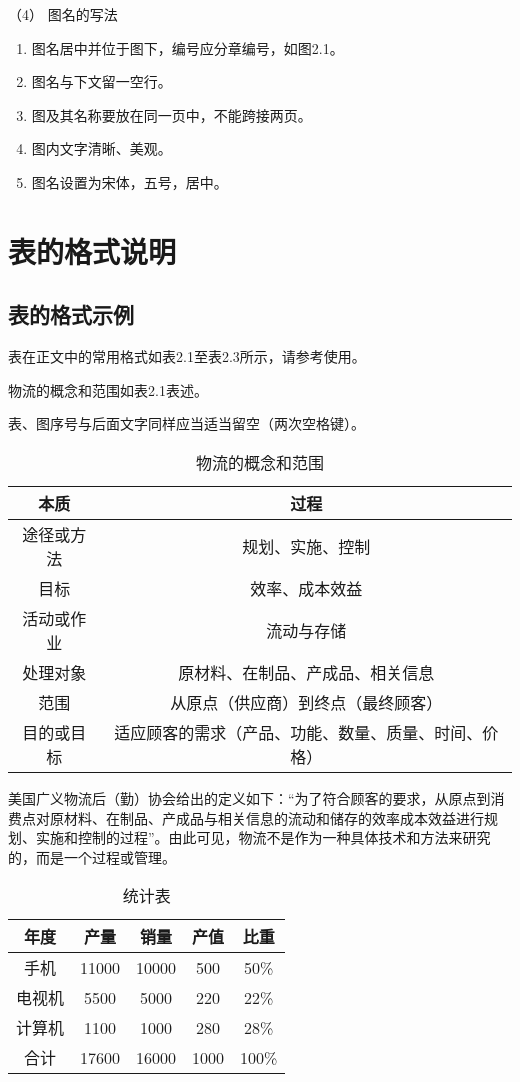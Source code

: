 （4） 图名的写法
\begin{enumerate}[label=\circled{\arabic*}]
\item 图名居中并位于图下，编号应分章编号，如图2.1。
\item 图名与下文留一空行。
\item 图及其名称要放在同一页中，不能跨接两页。
\item 图内文字清晰、美观。
\item 图名设置为宋体，五号，居中。
\end{enumerate}

\section{表的格式说明}
\subsection{表的格式示例}
表在正文中的常用格式如表2.1至表2.3所示，请参考使用。

物流的概念和范围如表2.1表述。

表、图序号与后面文字同样应当适当留空（两次空格键）。

\begin{table}
	\centering
	\song\wuhao 
	\caption{物流的概念和范围}
	\begin{tabular}{cc}
	\hline
	本质&过程\\
	\hline
	途径或方法&规划、实施、控制\\
	目标&效率、成本效益\\
	活动或作业&流动与存储\\
	处理对象&原材料、在制品、产成品、相关信息\\
	范围&从原点（供应商）到终点（最终顾客）\\
	目的或目标&适应顾客的需求（产品、功能、数量、质量、时间、价格）\\
	\hline
	\end{tabular}
\end{table}

美国广义物流后（勤）协会给出的定义如下：“为了符合顾客的要求，从原点到消费点对原材料、在制品、产成品与相关信息的流动和储存的效率成本效益进行规划、实施和控制的过程”。由此可见，物流不是作为一种具体技术和方法来研究的，而是一个过程或管理。

\begin{table}
	\centering
	\song\wuhao
	\caption{ 统计表}
	\begin{tabular}{ccccc}
	\hline
	年度&产量&销量&产值&比重\\
	\hline
	手机&11000&10000&500&50\%\\
	电视机&5500&5000&220&22\%\\
	计算机&1100&1000&280&28\%\\
	\hline
	合计&17600&16000&1000&100\%\\
	\hline
	\end{tabular}
\end{table}


